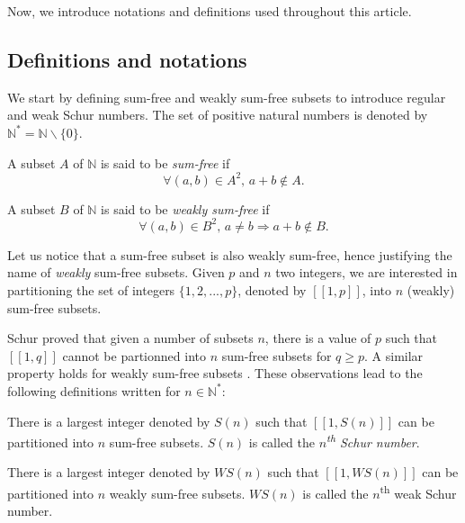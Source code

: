 \documentclass[final,onefignum,onetabnum]{siamart190516}
\newcommand{\WS}{\mathit{WS}}
\begin{document}
\par
Now, we introduce notations and definitions used throughout this article.

\subsection{Definitions and notations}

We start by defining sum-free and weakly sum-free subsets to introduce regular and weak Schur numbers.
The set of positive natural numbers is denoted by \(\mathbb{N}^* =\mathbb{N} \backslash \{0\}\).

\begin{definition}
A subset \(A\) of \(\mathbb{N}\) is said to be \textit{sum-free} if
\[ \forall (a,b) \in A^2 \text{, } a+b \notin A.\]
\end{definition}

\begin{definition}
A subset \(B\) of \(\mathbb{N}\) is said to be \textit{weakly sum-free} if
\[ \forall (a,b) \in B^2 \text{, } a \neq b \Longrightarrow a+b \notin B.\]
\end{definition}

Let us notice that a sum-free subset is also weakly sum-free, hence justifying the name of \textit{weakly} sum-free
subsets. Given \(p\) and \(n\) two integers, we are interested in partitioning the set of integers \(\{1, 2, ..., p\}\),
denoted by \([\![1,p]\!]\), into \(n\) (weakly) sum-free subsets.

\par
Schur proved \cite{Schur1917} that given a number of subsets \(n\), there is a value of \(p\)
such that \([\![1,q]\!]\) cannot be partionned into \(n\) sum-free subsets for \(q \geqslant p\). A similar
property holds for weakly sum-free subsets \cite{Irving1973}. These observations lead to the following definitions
written for \(n \in \mathbb{N}^*\):

\begin{definition}
There is a largest integer denoted by \(S(n)\) such that \([\![1, S(n)]\!]\) can be
 partitioned into \(n\) sum-free subsets. \(S(n)\) is called the \textit{\(n\)\textsuperscript{th} Schur number}.
\end{definition}

\begin{definition}
There is a largest integer denoted by \(\WS (n)\) such that \([\![1, \WS (n)]\!]\)
can be partitioned into \(n\) weakly sum-free subsets. \(\WS(n)\) is called the \(n\)\textsuperscript{th} weak Schur
number.
\end{definition}
\end{document}
